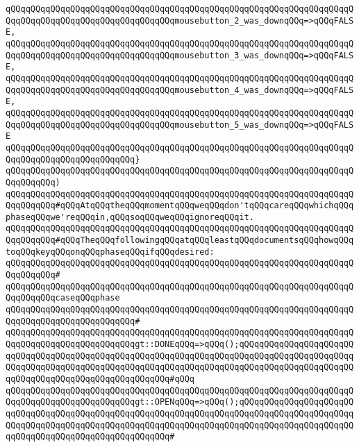 \verb|qQQqqQQqqQQqqQQqqQQqqQQqqQQqqQQqqQQqqQQqqQQqqQQqqQQqqQQqqQQqqQQqqQQqqQQqqQQqqQQqqQQqqQQqqQQqqQQqqQQqqQQqmousebutton_2_was_downqQQq=>qQQqFALSE,|\newline
\verb|qQQqqQQqqQQqqQQqqQQqqQQqqQQqqQQqqQQqqQQqqQQqqQQqqQQqqQQqqQQqqQQqqQQqqQQqqQQqqQQqqQQqqQQqqQQqqQQqqQQqqQQqmousebutton_3_was_downqQQq=>qQQqFALSE,|\newline
\verb|qQQqqQQqqQQqqQQqqQQqqQQqqQQqqQQqqQQqqQQqqQQqqQQqqQQqqQQqqQQqqQQqqQQqqQQqqQQqqQQqqQQqqQQqqQQqqQQqqQQqqQQqmousebutton_4_was_downqQQq=>qQQqFALSE,|\newline
\verb|qQQqqQQqqQQqqQQqqQQqqQQqqQQqqQQqqQQqqQQqqQQqqQQqqQQqqQQqqQQqqQQqqQQqqQQqqQQqqQQqqQQqqQQqqQQqqQQqqQQqqQQqmousebutton_5_was_downqQQq=>qQQqFALSE|\newline
\verb|qQQqqQQqqQQqqQQqqQQqqQQqqQQqqQQqqQQqqQQqqQQqqQQqqQQqqQQqqQQqqQQqqQQqqQQqqQQqqQQqqQQqqQQqqQQqqQQq}|\newline
\verb|qQQqqQQqqQQqqQQqqQQqqQQqqQQqqQQqqQQqqQQqqQQqqQQqqQQqqQQqqQQqqQQqqQQqqQQqqQQqqQQq)|\newline
\newline
\verb|qQQqqQQqqQQqqQQqqQQqqQQqqQQqqQQqqQQqqQQqqQQqqQQqqQQqqQQqqQQqqQQqqQQqqQQqqQQqqQQq#qQQqAtqQQqtheqQQqmomentqQQqweqQQqdon'tqQQqcareqQQqwhichqQQqphaseqQQqwe'reqQQqin,qQQqsoqQQqweqQQqignoreqQQqit.|\newline
\verb|qQQqqQQqqQQqqQQqqQQqqQQqqQQqqQQqqQQqqQQqqQQqqQQqqQQqqQQqqQQqqQQqqQQqqQQqqQQqqQQq#qQQqTheqQQqfollowingqQQqatqQQqleastqQQqdocumentsqQQqhowqQQqtoqQQqkeyqQQqonqQQqphaseqQQqifqQQqdesired:|\newline
\verb|qQQqqQQqqQQqqQQqqQQqqQQqqQQqqQQqqQQqqQQqqQQqqQQqqQQqqQQqqQQqqQQqqQQqqQQqqQQqqQQq#|\newline
\verb|qQQqqQQqqQQqqQQqqQQqqQQqqQQqqQQqqQQqqQQqqQQqqQQqqQQqqQQqqQQqqQQqqQQqqQQqqQQqqQQqcaseqQQqphase|\newline
\verb|qQQqqQQqqQQqqQQqqQQqqQQqqQQqqQQqqQQqqQQqqQQqqQQqqQQqqQQqqQQqqQQqqQQqqQQqqQQqqQQqqQQqqQQqqQQqqQQq#|\newline
\verb|qQQqqQQqqQQqqQQqqQQqqQQqqQQqqQQqqQQqqQQqqQQqqQQqqQQqqQQqqQQqqQQqqQQqqQQqqQQqqQQqqQQqqQQqqQQqqQQqgt::DONEqQQq=>qQQq();qQQqqQQqqQQqqQQqqQQqqQQqqQQqqQQqqQQqqQQqqQQqqQQqqQQqqQQqqQQqqQQqqQQqqQQqqQQqqQQqqQQqqQQqqQQqqQQqqQQqqQQqqQQqqQQqqQQqqQQqqQQqqQQqqQQqqQQqqQQqqQQqqQQqqQQqqQQqqQQqqQQqqQQqqQQqqQQqqQQqqQQqqQQqqQQqqQQq#qQQq|\newline
\verb|qQQqqQQqqQQqqQQqqQQqqQQqqQQqqQQqqQQqqQQqqQQqqQQqqQQqqQQqqQQqqQQqqQQqqQQqqQQqqQQqqQQqqQQqqQQqqQQqgt::OPENqQQq=>qQQq();qQQqqQQqqQQqqQQqqQQqqQQqqQQqqQQqqQQqqQQqqQQqqQQqqQQqqQQqqQQqqQQqqQQqqQQqqQQqqQQqqQQqqQQqqQQqqQQqqQQqqQQqqQQqqQQqqQQqqQQqqQQqqQQqqQQqqQQqqQQqqQQqqQQqqQQqqQQqqQQqqQQqqQQqqQQqqQQqqQQqqQQqqQQqqQQqqQQq#|\newline
